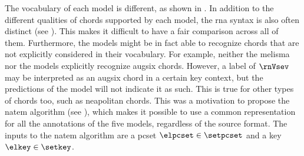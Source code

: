 
The vocabulary of each model is different, as shown in
. In addition to the different
qualities of chords supported by each model, the \gls{rna}
syntax is also often distinct (see
). This
makes it difficult to have a fair comparison across all of
them. Furthermore, the models might be in fact able to
recognize chords that are not explicitly considered in their
vocabulary. For example, neither the \gls{melisma} nor the
\textcite{mcleod2021modular} models explicitly recognize
\gls{augsix} chords. However, a label of $\rnVsev$ may be
interpreted as an \gls{augsix} chord in a certain key
context, but the predictions of the model will not indicate
it as such. This is true for other types of chords too, such
as \gls{neapolitan} chords. This was a motivation to propose
the \gls{natem} algorithm (see
), which
makes it possible to use a common representation for all the
annotations of the five models, regardless of the source
format. The inputs to the \gls{natem} algorithm are a
\gls{pcset} $\elpcset \in \setpcset$ and a key $\elkey \in
\setkey$.

